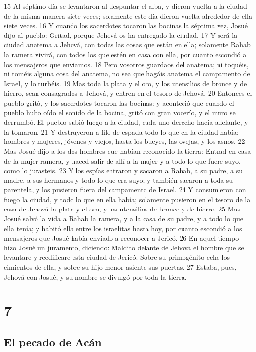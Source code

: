 15 Al séptimo día se levantaron al despuntar el alba, y dieron vuelta a la ciudad de la misma manera siete veces; solamente este día dieron vuelta alrededor de ella siete veces.
16 Y cuando los sacerdotes tocaron las bocinas la séptima vez, Josué dijo al pueblo: Gritad, porque Jehová os ha entregado la ciudad.
17 Y será la ciudad anatema a Jehová, con todas las cosas que están en ella; solamente Rahab la ramera vivirá, con todos los que estén en casa con ella, por cuanto escondió a los mensajeros que enviamos.
18 Pero vosotros guardaos del anatema; ni toquéis, ni toméis alguna cosa del anatema, no sea que hagáis anatema el campamento de Israel, y lo turbéis.
19 Mas toda la plata y el oro, y los utensilios de bronce y de hierro, sean consagrados a Jehová, y entren en el tesoro de Jehová.
20 Entonces el pueblo gritó, y los sacerdotes tocaron las bocinas; y aconteció que cuando el pueblo hubo oído el sonido de la bocina, gritó con gran vocerío, y el muro se derrumbó. El pueblo subió luego a la ciudad, cada uno derecho hacia adelante, y la tomaron.
21 Y destruyeron a filo de espada todo lo que en la ciudad había; hombres y mujeres, jóvenes y viejos, hasta los bueyes, las ovejas, y los asnos.
22 Mas Josué dijo a los dos hombres que habían reconocido la tierra: Entrad en casa de la mujer ramera, y haced salir de allí a la mujer y a todo lo que fuere suyo, como lo jurasteis.
23 Y los espías entraron y sacaron a Rahab, a su padre, a su madre, a sus hermanos y todo lo que era suyo; y también sacaron a toda su parentela, y los pusieron fuera del campamento de Israel.
24 Y consumieron con fuego la ciudad, y todo lo que en ella había; solamente pusieron en el tesoro de la casa de Jehová la plata y el oro, y los utensilios de bronce y de hierro.
25 Mas Josué salvó la vida a Rahab la ramera, y a la casa de su padre, y a todo lo que ella tenía; y habitó ella entre los israelitas hasta hoy, por cuanto escondió a los mensajeros que Josué había enviado a reconocer a Jericó. 
26 En aquel tiempo hizo Josué un juramento, diciendo: Maldito delante de Jehová el hombre que se levantare y reedificare esta ciudad de Jericó. Sobre su primogénito eche los cimientos de ella, y sobre su hijo menor asiente sus puertas. 
27 Estaba, pues, Jehová con Josué, y su nombre se divulgó por toda la tierra.

\chapter{7}

\section*{El pecado de Acán}

